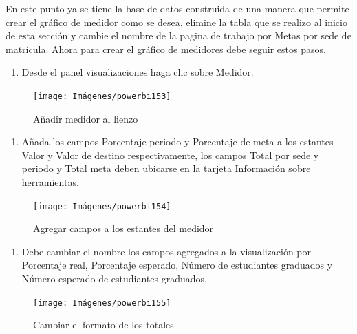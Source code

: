 \documentclass[
]{book}
\providecommand{\tightlist}{%
  \setlength{\itemsep}{0pt}\setlength{\parskip}{0pt}}
\begin{document}
En este punto ya se tiene la base de datos construida de una manera que permite crear el gráfico de medidor como se desea, elimine la tabla que se realizo al inicio de esta sección y cambie el nombre de la pagina de trabajo por Metas por sede de matrícula. Ahora para crear el gráfico de medidores debe seguir estos pasos.

\begin{enumerate}
\def\labelenumi{\arabic{enumi}.}
\tightlist
\item
  Desde el panel visualizaciones haga clic sobre Medidor.
\end{enumerate}

\begin{figure}

{\centering \texttt{[image: Imágenes/powerbi153]} 

}

\caption{Añadir medidor al lienzo}\label{fig:paso1medidor-fig}
\end{figure}

\begin{enumerate}
\def\labelenumi{\arabic{enumi}.}
\setcounter{enumi}{1}
\tightlist
\item
  Añada los campos Porcentaje periodo y Porcentaje de meta a los estantes Valor y Valor de destino respectivamente, los campos Total por sede y periodo y Total meta deben ubicarse en la tarjeta Información sobre herramientas.
\end{enumerate}

\begin{figure}

{\centering \texttt{[image: Imágenes/powerbi154]} 

}

\caption{Agregar campos a los estantes del medidor}\label{fig:paso2medidor-fig}
\end{figure}

\begin{enumerate}
\def\labelenumi{\arabic{enumi}.}
\setcounter{enumi}{2}
\tightlist
\item
  Debe cambiar el nombre los campos agregados a la visualización por Porcentaje real, Porcentaje esperado, Número de estudiantes graduados y Número esperado de estudiantes graduados.
\end{enumerate}

\begin{figure}

{\centering \texttt{[image: Imágenes/powerbi155]} 

}

\caption{Cambiar el formato de los totales}\label{fig:paso3medidor-fig}
\end{figure}
\end{document}
